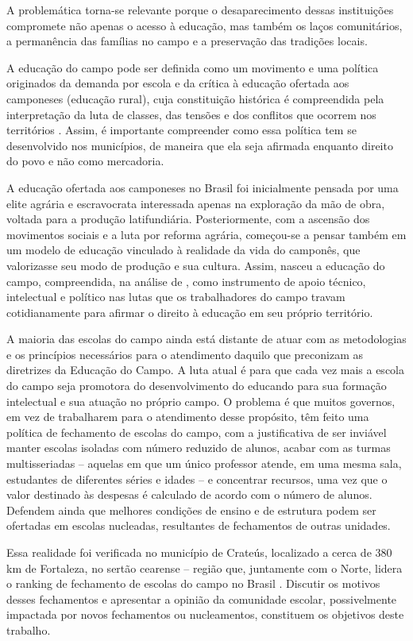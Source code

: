 \documentclass[
  12pt,
  openright,
  twoside,
  a4paper,
  english,
  brazilian,
  sumario=tradicional
]{abntex2}
\begin{document}
A problemática torna-se relevante porque o desaparecimento dessas instituições compromete não apenas o acesso à educação, mas também os laços comunitários, a permanência das famílias no campo e a preservação das tradições locais.

A educação do campo pode ser definida como um movimento e uma política originados da demanda por escola e da crítica à educação ofertada aos camponeses (educação rural), cuja constituição histórica é compreendida pela interpretação da luta de classes, das tensões e dos conflitos que ocorrem nos territórios \cite{caldart2009}. Assim, é importante compreender como essa política tem se desenvolvido nos municípios, de maneira que ela seja afirmada enquanto direito do povo e não como mercadoria.

A educação ofertada aos camponeses no Brasil foi inicialmente pensada por uma elite agrária e escravocrata interessada apenas na exploração da mão de obra, voltada para a produção latifundiária. Posteriormente, com a ascensão dos movimentos sociais e a luta por reforma agrária, começou-se a pensar também em um modelo de educação vinculado à realidade da vida do camponês, que valorizasse seu modo de produção e sua cultura. Assim, nasceu a educação do campo, compreendida, na análise de , como instrumento de apoio técnico, intelectual e político nas lutas que os trabalhadores do campo travam cotidianamente para afirmar o direito à educação em seu próprio território.

A maioria das escolas do campo ainda está distante de atuar com as metodologias e os princípios necessários para o atendimento daquilo que preconizam as diretrizes da Educação do Campo. A luta atual é para que cada vez mais a escola do campo seja promotora do desenvolvimento do educando para sua formação intelectual e sua atuação no próprio campo. O problema é que muitos governos, em vez de trabalharem para o atendimento desse propósito, têm feito uma política de fechamento de escolas do campo, com a justificativa de ser inviável manter escolas isoladas com número reduzido de alunos, acabar com as turmas multisseriadas -- aquelas em que um único professor atende, em uma mesma sala, estudantes de diferentes séries e idades -- e concentrar recursos, uma vez que o valor destinado às despesas é calculado de acordo com o número de alunos. Defendem ainda que melhores condições de ensino e de estrutura podem ser ofertadas em escolas nucleadas, resultantes de fechamentos de outras unidades.

Essa realidade foi verificada no município de Crateús, localizado a cerca de 380 km de Fortaleza, no sertão cearense -- região que, juntamente com o Norte, lidera o ranking de fechamento de escolas do campo no Brasil \cite{santosbezerra2025}. Discutir os motivos desses fechamentos e apresentar a opinião da comunidade escolar, possivelmente impactada por novos fechamentos ou nucleamentos, constituem os objetivos deste trabalho.
\end{document}
